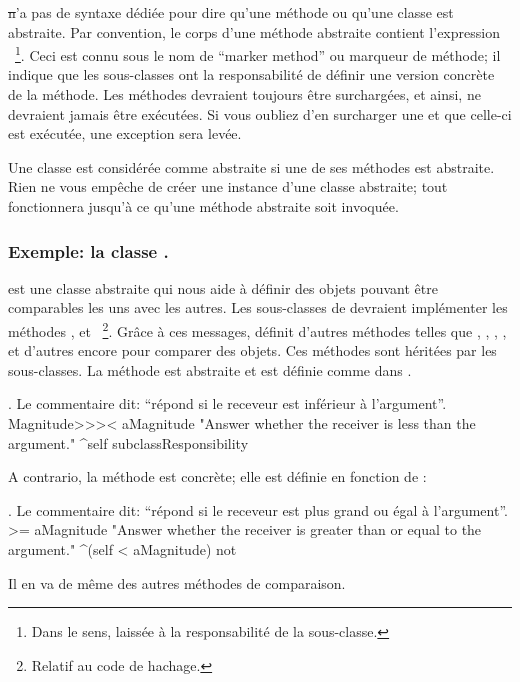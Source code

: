 \documentclass[a4paper,10pt,twoside]{book}
\begin{document}
\st n'a pas de syntaxe d\'edi\'ee pour dire qu'une m\'ethode ou qu'une classe est abstraite. 
Par convention, le corps d'une m\'ethode abstraite contient l'expression ~\footnote{Dans le sens, laiss\'ee \`a la responsabilit\'e de la sous-classe.}. 
Ceci est connu sous le nom de ``marker method'' ou marqueur de m\'ethode; il indique que les sous-classes ont la responsabilit\'e de d\'efinir une version concr\`ete de la m\'ethode. 
Les m\'ethodes  devraient toujours \^etre surcharg\'ees, et ainsi, ne devraient jamais \^etre ex\'ecut\'ees.
Si vous oubliez d'en surcharger une et que celle-ci est ex\'ecut\'ee, une exception sera lev\'ee. 

Une classe est consid\'er\'ee comme abstraite si une de ses m\'ethodes est abstraite.
Rien ne vous emp\^eche de cr\'eer une instance d'une classe abstraite; tout fonctionnera jusqu'\`a ce qu'une m\'ethode abstraite soit invoqu\'ee. 

\subsubsection{Exemple: la classe .}
 est une classe abstraite qui nous aide \`a d\'efinir
des objets pouvant \^etre comparables les uns avec les autres. Les
sous-classes de  devraient impl\'ementer les m\'ethodes
\ct{<}, \ct{=} et ~\footnote{Relatif au code de hachage.}.
Gr\^ace \`a ces messages,  d\'efinit d'autres m\'ethodes telles que
\ct{>}, \ct{>=}, \ct{<=}, ,   et
d'autres encore pour comparer des objets.
Ces m\'ethodes sont h\'erit\'ees par les sous-classes.
La m\'ethode  est abstraite et est d\'efinie comme
dans .

\begin{method}[MagnitudeLessThan]{. Le commentaire dit: ``r\'epond si le receveur est inf\'erieur \`a l'argument''.}
Magnitude>>>< aMagnitude 
	"Answer whether the receiver is less than the argument."
	^self subclassResponsibility
\end{method}

\noindent
A contrario, la m\'ethode  est concr\`ete; elle est d\'efinie en fonction de \ct{<}:

\begin{method}[Magnitude>=]{. Le commentaire dit: ``r\'epond si le receveur est plus grand ou \'egal \`a l'argument''.}
>= aMagnitude 
	"Answer whether the receiver is greater than or equal to the argument."
	^(self < aMagnitude) not
\end{method}
Il en va de m\^eme des autres m\'ethodes de comparaison.
\end{document}

